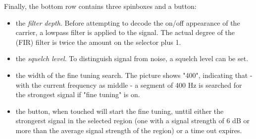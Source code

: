 \documentclass[11pt]{article}
\begin{document}
Finally, the bottom row contains three spinboxes and a button:
\begin{itemize}
\item the {\em filter depth}. Before attempting to decode the on/off appearance
of the carrier, a lowpass filter is applied to the signal. The actual
degree of the (FIR) filter is twice the amount on the selector plus 1.
\item the {\em squelch level}. To distinguish signal from noise, a squelch level
can be set.
\item the width of the fine tuning search. The picture shows "400", indicating
that - with the current frequency as middle - a segment of 400 Hz is searched
for the strongest signal if "fine tuning" is on.
\item the button, when touched will start the fine tuning, unttil either
the strongerst signal in the selected region (one with a signal strength
of 6 dB or more than the average signal strength of the region) or a time out
expires.
\end{itemize}
\end{document}
